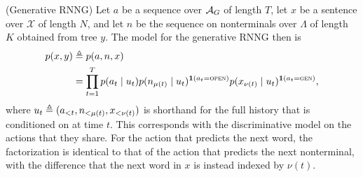 
    \begin{definition}{(Generative RNNG)}
      \label{def:gen-rnng}
      Let $a$ be a sequence over $\mathcal{A}_G$ of length $T$, let $x$ be a sentence over $\mathcal{X}$ of length $N$, and let $n$ be the sequence on nonterminals over $\Lambda$ of length $K$ obtained from tree $y$. The model for the generative RNNG then is
      \begin{align*}
        p(x, y)
          &\triangleq p(a, n, x)  \\
          &= \prod_{t=1}^T
            p( a_t \mid u_t ) p(n_{ \mu(t) } \mid u_t)^{ \operatorname{\mathbf{1}}(a_t = \textsc{open}) } p(x_{ \nu(t) } \mid u_t)^{ \operatorname{\mathbf{1}}(a_t = \textsc{gen}) },
      \end{align*}
      where $u_t \triangleq (a_{<t}, n_{ <\mu(t) }, x_{ <\nu(t) })$ is shorthand for the full history that is conditioned on at time $t$. This corresponds with the discriminative model on the actions that they share. For the action that predicts the next word, the factorization is identical to that of the action that predicts the next nonterminal, with the difference that the next word in $x$ is instead indexed by $\nu(t)$.
    \end{definition}

